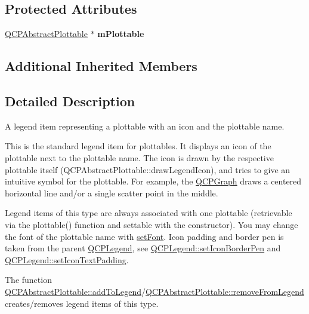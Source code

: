 \subsection*{Protected Attributes}
\begin{DoxyCompactItemize}
\item 
\mbox{\label{classQCPPlottableLegendItem_ada647fb4b22971a1a424e15b4f6af0d9}} 
\hyperlink{classQCPAbstractPlottable}{Q\+C\+P\+Abstract\+Plottable} $\ast$ {\bfseries m\+Plottable}
\end{DoxyCompactItemize}
\subsection*{Additional Inherited Members}


\subsection{Detailed Description}
A legend item representing a plottable with an icon and the plottable name. 

This is the standard legend item for plottables. It displays an icon of the plottable next to the plottable name. The icon is drawn by the respective plottable itself (Q\+C\+P\+Abstract\+Plottable\+::draw\+Legend\+Icon), and tries to give an intuitive symbol for the plottable. For example, the \hyperlink{classQCPGraph}{Q\+C\+P\+Graph} draws a centered horizontal line and/or a single scatter point in the middle.

Legend items of this type are always associated with one plottable (retrievable via the plottable() function and settable with the constructor). You may change the font of the plottable name with \hyperlink{classQCPAbstractLegendItem_a409c53455d8112f71d70c0c43eb10265}{set\+Font}. Icon padding and border pen is taken from the parent \hyperlink{classQCPLegend}{Q\+C\+P\+Legend}, see \hyperlink{classQCPLegend_a2f2c93d18a651f4ff294bb3f026f49b8}{Q\+C\+P\+Legend\+::set\+Icon\+Border\+Pen} and \hyperlink{classQCPLegend_a62973bd69d5155e8ea3141366e8968f6}{Q\+C\+P\+Legend\+::set\+Icon\+Text\+Padding}.

The function \hyperlink{classQCPAbstractPlottable_aa64e93cb5b606d8110d2cc0a349bb30f}{Q\+C\+P\+Abstract\+Plottable\+::add\+To\+Legend}/\hyperlink{classQCPAbstractPlottable_a3cc235007e2343a65ad4f463767e0e20}{Q\+C\+P\+Abstract\+Plottable\+::remove\+From\+Legend} creates/removes legend items of this type.

